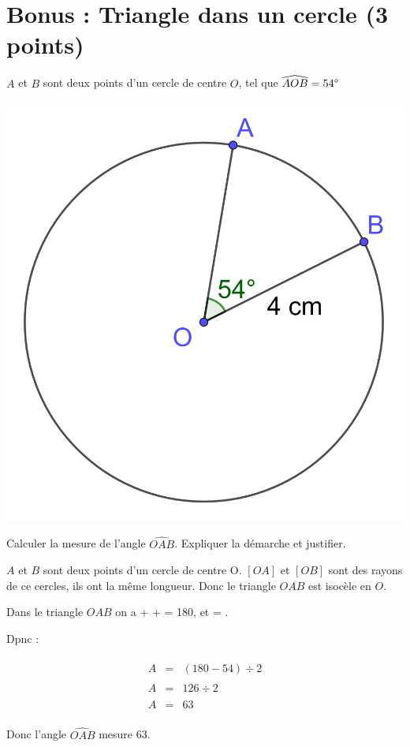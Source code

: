 \section*{Bonus : Triangle dans un cercle (3 points)}

$A$ et $B$ sont deux points d'un cercle de centre $O$, tel que $\widehat{AOB}=54\degree$

\begin{center}
	\includegraphics[scale=0.15]{img/cercle}
\end{center}

\begin{questions}
	\question[3] Calculer la mesure de l'angle $\widehat{OAB}$. Expliquer la démarche et justifier.
\end{questions}
\begin{solution}
	$A$ et $B$ sont deux points d'un cercle de centre O. $[OA]$ et $[OB]$ sont des rayons de ce cercles, ils ont la même longueur. Donc le triangle $OAB$ est isocèle en $O$.
	
	Dans le triangle $OAB$ on a  +  +  = 180\degree, et  = .
	
	Dpnc : 
	
	\begin{eqnarray*}
		\widehat{A} &=& (180 - 54) \div 2\\
		\widehat{A} &=& 126 \div 2 \\
		\widehat{A} &=& 63 \\
	\end{eqnarray*}

Donc l'angle $\widehat{OAB}$ mesure 63\degree.
\end{solution}